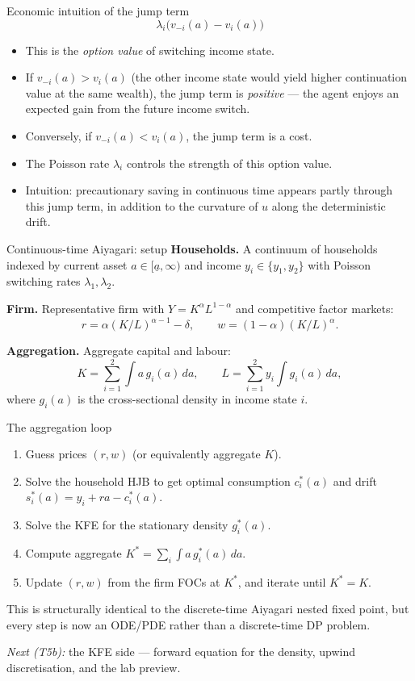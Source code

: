 \begin{frame}{Economic intuition of the jump term}
\[
\lambda_i \big(v_{-i}(a) - v_i(a)\big)
\]
\medskip
\begin{itemize}
\item This is the \emph{option value} of switching income state.
\medskip
\item If $v_{-i}(a) > v_i(a)$ (the other income state would yield higher continuation value at the same wealth), the jump term is \emph{positive} --- the agent enjoys an expected gain from the future income switch.
\medskip
\item Conversely, if $v_{-i}(a) < v_i(a)$, the jump term is a cost.
\medskip
\item The Poisson rate $\lambda_i$ controls the strength of this option value.
\medskip
\item Intuition: precautionary saving in continuous time appears partly through this jump term, in addition to the curvature of $u$ along the deterministic drift.
\end{itemize}
\end{frame}

\begin{frame}{Continuous-time Aiyagari: setup}
\textbf{Households.} A continuum of households indexed by current asset $a \in [\underline a, \infty)$ and income $y_i \in \{y_1, y_2\}$ with Poisson switching rates $\lambda_1, \lambda_2$.
\medskip

\textbf{Firm.} Representative firm with $Y = K^\alpha L^{1-\alpha}$ and competitive factor markets:
\[
r = \alpha (K/L)^{\alpha-1} - \delta, \qquad w = (1-\alpha) (K/L)^\alpha.
\]
\medskip

\textbf{Aggregation.} Aggregate capital and labour:
\[
K = \sum_{i=1}^{2} \int a\, g_i(a)\, da, \qquad
L = \sum_{i=1}^{2} y_i \int g_i(a)\, da,
\]
where $g_i(a)$ is the cross-sectional density in income state $i$.
\end{frame}

\begin{frame}{The aggregation loop}
\begin{enumerate}
\item Guess prices $(r, w)$ (or equivalently aggregate $K$).
\medskip
\item Solve the household HJB to get optimal consumption $c_i^*(a)$ and drift $s_i^*(a) = y_i + r a - c_i^*(a)$.
\medskip
\item Solve the KFE for the stationary density $g_i^*(a)$.
\medskip
\item Compute aggregate $K^* = \sum_i \int a\, g_i^*(a)\, da$.
\medskip
\item Update $(r,w)$ from the firm FOCs at $K^*$, and iterate until $K^* = K$.
\end{enumerate}
\medskip

This is structurally identical to the discrete-time Aiyagari nested fixed point, but every step is now an ODE/PDE rather than a discrete-time DP problem.
\medskip

\emph{Next (T5b):} the KFE side --- forward equation for the density, upwind discretisation, and the lab preview.
\end{frame}


